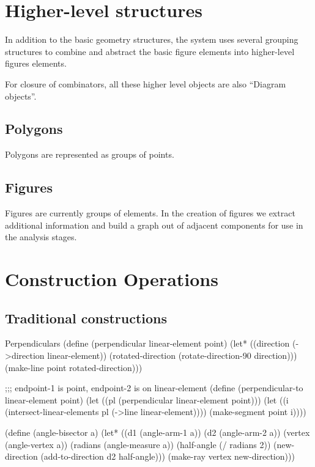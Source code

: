 \section{Higher-level structures}

In addition to the basic geometry structures, the system uses several
grouping structures to combine and abstract the basic figure elements
into higher-level figures elements.

For closure of combinators, all these higher level objects are also
``Diagram objects''.

\subsection{Polygons}

Polygons are represented as groups of points.

\subsection{Figures}

Figures are currently groups of elements. In the creation of figures
we extract additional information and build a graph out of adjacent
components for use in the analysis stages.

\section{Construction Operations}

\subsection{Traditional constructions}

\begin{code-listing}{Perpendiculars}
(define (perpendicular linear-element point)
  (let* ((direction (->direction linear-element))
         (rotated-direction (rotate-direction-90 direction)))
    (make-line point rotated-direction)))

;;; endpoint-1 is point, endpoint-2 is on linear-element
(define (perpendicular-to linear-element point)
  (let ((pl (perpendicular linear-element point)))
    (let ((i (intersect-linear-elements pl (->line linear-element))))
      (make-segment point i))))

(define (angle-bisector a)
  (let* ((d1 (angle-arm-1 a))
         (d2 (angle-arm-2 a))
         (vertex (angle-vertex a))
         (radians (angle-measure a))
         (half-angle (/ radians 2))
         (new-direction (add-to-direction d2 half-angle)))
    (make-ray vertex new-direction)))
\end{code-listing}

